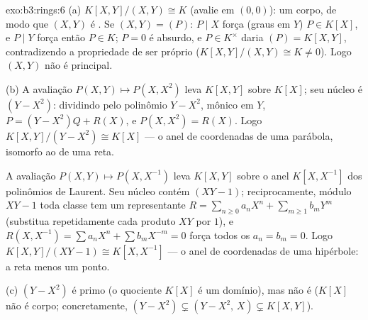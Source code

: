 \begin{solution}{exo:b3:rings:6}
(a) $K[X,Y]/(X,Y) \cong K$ (avalie em $(0,0)$): um corpo, de modo que $(X,Y)$ é
. Se $(X, Y) = (P)$: $P \mid X$ força (graus em $Y$) $P \in K[X]$, e $P \mid Y$ força
então $P \in K$; $P =
0$ é absurdo, e $P \in K^\times$ daria $(P) = K[X,Y]$, contradizendo a
propriedade de ser próprio ($K[X,Y]/(X,Y) \cong K \neq 0$). Logo $(X,Y)$ não é principal.

(b) A avaliação $P(X, Y) \mapsto P(X, X^2)$ leva $K[X,Y]$ sobre $K[X]$; seu núcleo é
$(Y - X^2)$: dividindo pelo polinômio $Y - X^2$, mônico em $Y$, $P = (Y - X^2)Q + R(X)$, e $P(X, X^2) =
R(X)$.
Logo $K[X,Y]/(Y - X^2) \cong K[X]$ --- o anel de coordenadas de uma parábola, isomorfo ao de uma
reta.

A avaliação $P(X, Y) \mapsto P(X, X^{-1})$ leva $K[X, Y]$ sobre o anel $K[X, X^{-1}]$ dos polinômios de
Laurent. Seu núcleo contém $(XY - 1)$; reciprocamente, módulo $XY - 1$
toda classe tem um representante $R = \sum_{n \geq 0} a_nX^n + \sum_{m \geq 1} b_m
Y^m$ (substitua repetidamente cada
produto $XY$ por $1$), e $R(X,
X^{-1}) = \sum a_n X^n + \sum b_m X^{-m} = 0$ força todos os $a_n =
b_m = 0$. Logo $K[X, Y]/(XY - 1) \cong K[X, X^{-1}]$
--- o anel de coordenadas de uma hipérbole: a reta menos um ponto.

(c) $(Y - X^2)$ é primo (o quociente $K[X]$ é um domínio), mas não é
 ($K[X]$ não é corpo; concretamente, $(Y - X^2) \subsetneq
(Y - X^2,\, X) \subsetneq K[X,Y]$).
\end{solution}

